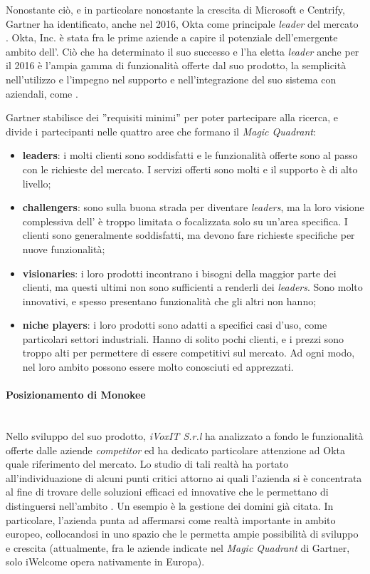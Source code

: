 Nonostante ciò, e in particolare nonostante la crescita di Microsoft e Centrify, Gartner ha identificato, anche nel 2016, Okta come principale \textit{leader} del mercato . Okta, Inc. è stata fra le prime aziende a capire il potenziale dell'emergente ambito dell’. Ciò che ha determinato il suo successo e l'ha eletta \textit{leader} anche per il 2016 è l'ampia gamma di funzionalità offerte dal suo prodotto, la semplicità nell'utilizzo e l'impegno nel supporto e nell'integrazione del suo sistema con  aziendali, come .

Gartner stabilisce dei ''requisiti minimi'' per poter partecipare alla ricerca, e divide i partecipanti nelle quattro aree che formano il \textit{Magic Quadrant}:
\begin{itemize}
\item \textbf{leaders}: i molti clienti sono soddisfatti e le funzionalità offerte sono al passo con le richieste del mercato. I servizi offerti sono molti e il supporto è di alto livello;
\item \textbf{challengers}: sono sulla buona strada per diventare \textit{leaders}, ma la loro visione complessiva dell' è troppo limitata o focalizzata solo su un'area specifica. I clienti sono generalmente soddisfatti, ma devono fare richieste specifiche per nuove funzionalità;
\item \textbf{visionaries}: i loro prodotti incontrano i bisogni della maggior parte dei clienti, ma questi ultimi non sono sufficienti a renderli dei \textit{leaders}. Sono molto innovativi, e spesso presentano funzionalità che gli altri non hanno;
\item \textbf{niche players}: i loro prodotti sono adatti a specifici casi d'uso, come particolari settori industriali. Hanno di solito pochi clienti, e i prezzi sono troppo alti per permettere di essere competitivi sul mercato. Ad ogni modo, nel loro ambito possono essere molto conosciuti ed apprezzati.
\end{itemize}

\paragraph{Posizionamento di Monokee} \mbox{} \\
Nello sviluppo del suo prodotto, \textit{iVoxIT S.r.l} ha analizzato a fondo le funzionalità offerte dalle aziende \textit{competitor} ed ha dedicato particolare attenzione ad Okta quale riferimento del mercato. Lo studio di tali realtà ha portato all'individuazione di alcuni punti critici attorno ai quali l'azienda si è concentrata al fine di trovare delle soluzioni efficaci ed innovative che le permettano di distinguersi nell'ambito . Un esempio è la gestione dei domini già citata. In particolare, l'azienda punta ad affermarsi come realtà importante in ambito europeo, collocandosi in uno spazio che le permetta ampie possibilità di sviluppo e crescita (attualmente, fra le aziende indicate nel \textit{Magic Quadrant} di Gartner, solo iWelcome opera nativamente in Europa).